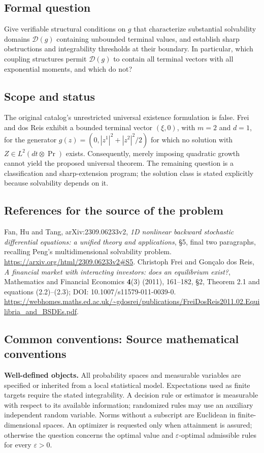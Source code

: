 \documentclass[11pt,a4paper]{article}
\begin{document}
\subsection*{Formal question}
Give verifiable structural conditions on $g$ that characterize substantial
solvability domains $\mathcal D(g)$ containing unbounded terminal values,
and establish sharp obstructions and integrability thresholds at their
boundary. In particular, which coupling structures permit
$\mathcal D(g)$ to contain all terminal vectors with all exponential
moments, and which do not?
\subsection*{Scope and status}
The original catalog's unrestricted universal existence formulation is
false. Frei and dos Reis exhibit a bounded terminal vector $(\xi,0)$,
with $m=2$ and $d=1$, for the generator
$g(z)=(0,|z^1|^2+|z^2|^2/2)$ for which no solution with
$Z\in L^2(dt\otimes\Pr)$ exists. Consequently, merely imposing
quadratic growth cannot yield the proposed universal theorem. The
remaining question is a classification and sharp-extension program;
the solution class is stated explicitly because solvability depends on it.
\subsection*{References for the source of the problem}
Fan, Hu and Tang, arXiv:2309.06233v2, \emph{1D nonlinear backward
stochastic differential equations: a unified theory and applications},
\S5, final two paragraphs, recalling Peng's multidimensional solvability
problem. \url{https://arxiv.org/html/2309.06233v2#S5}.
Christoph Frei and Gon\c{c}alo dos Reis, \emph{A financial market with
interacting investors: does an equilibrium exist?}, Mathematics and
Financial Economics \textbf{4}(3) (2011), 161--182, \S2, Theorem 2.1
and equations (2.2)--(2.3); DOI: 10.1007/s11579-011-0039-0.
\url{https://webhomes.maths.ed.ac.uk/~gdosrei/publications/FreiDosReis2011.02.Equilibria_and_BSDEs.pdf}.

\subsection*{Common conventions: Source mathematical conventions}

\textbf{Well-defined objects.}
All probability spaces and measurable variables are specified or inherited
from a local statistical model. Expectations used as finite targets require
the stated integrability. A decision rule or estimator is measurable with
respect to its available information; randomized rules may use an auxiliary
independent random variable. Norms without a subscript are Euclidean in
finite-dimensional spaces. An optimizer is requested only when attainment
is assured; otherwise the question concerns the optimal value and
$\varepsilon$-optimal admissible rules for every $\varepsilon>0$.
\end{document}
